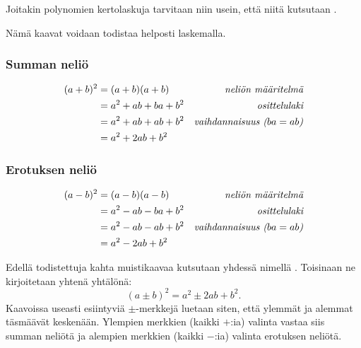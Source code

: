 
Joitakin polynomien kertolaskuja tarvitaan niin usein, että niitä kutsutaan .


Nämä kaavat voidaan todistaa helposti laskemalla. %

\subsubsection*{Summan neliö}

\begin{align*}
(a+b)^2 &= (a+b)(a+b) &\emph{neliön määritelmä} \\
&= a^2+ab+ba+b^2 &\emph{osittelulaki} \\
&= a^2+ab+ab+b^2 &\emph{vaihdannaisuus ($ba=ab$)} \\
&= a^2+2ab+b^2
\end{align*}

\subsubsection*{Erotuksen neliö}

\begin{align*}
(a-b)^2 &= (a-b)(a-b) &\emph{neliön määritelmä} \\
&= a^2-ab-ba+b^2 &\emph{osittelulaki} \\
&= a^2-ab-ab+b^2 &\emph{vaihdannaisuus ($ba=ab$)} \\
&= a^2-2ab+b^2
\end{align*}

Edellä todistettuja kahta muistikaavaa kutsutaan yhdessä nimellä . Toisinaan ne kirjoitetaan yhtenä yhtälönä:
$$(a \pm b)^2=a^2 \pm 2ab+b^2.$$
Kaavoissa useasti esiintyviä $\pm$-merkkejä luetaan siten, että ylemmät ja alemmat täsmäävät keskenään. Ylempien merkkien (kaikki $+$:ia) valinta vastaa siis summan neliötä ja alempien merkkien (kaikki $-$:ia) valinta erotuksen neliötä.

